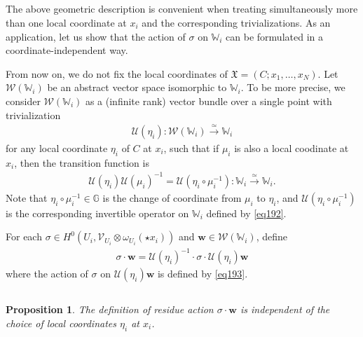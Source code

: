 \documentclass[11pt,b5paper,notitlepage]{article}
\theoremstyle{definition}
\theoremstyle{plain}
\newtheorem{pp}[df]{Proposition}
\newcommand{\fk}{\mathfrak}
\newcommand{\mc}{\mathcal}
\newcommand{\scr}{\mathscr}
\newcommand{\blt}{\bullet}
\newcommand{\Wbb}{\mathbb W}
\newcommand{\Gbb}{\mathbb G}
\newcommand{\wbf}{\mathbf w}
\numberwithin{equation}{section}
\begin{document}
\subsection{}


The above geometric description is convenient when treating simultaneously more than one local coordinate at $x_i$ and the corresponding trivializations. As an application, let us show that the action of $\sigma$ on $\Wbb_i$ can be formulated in a coordinate-independent way.



From now on, we do not fix the local coordinates of $\fk X=(C;x_1,\dots,x_N)$. Let $\scr W(\Wbb_i)$ be an abstract vector space isomorphic to $\Wbb_i$. To be more precise, we consider $\scr W(\Wbb_i)$ \index{W@$\scr W(\Wbb_i)$, $\scr W_{\fk X}(\Wbb_\blt)$} as a (infinite rank) vector bundle over a single point with trivialization \index{U@$\mc U(\alpha),\mc U(\eta),\mc U(\eta_\blt)$}
\begin{align}
\mc U(\eta_i):\scr W(\Wbb_i)\xrightarrow{\simeq} \Wbb_i
\end{align}
for any local coordinate $\eta_i$ of $C$ at $x_i$, such that if $\mu_i$ is also a local coodinate at $x_i$, then the transition function  is
\begin{align}
\mc U(\eta_i)\mc U(\mu_i)^{-1}=\mc U(\eta_i\circ\mu_i^{-1}):\Wbb_i\xrightarrow{\simeq}\Wbb_i.
\end{align}
Note that $\eta_i\circ\mu_i^{-1}\in\Gbb$ is the change of coordinate from $\mu_i$ to $\eta_i$, and $\mc U(\eta_i\circ\mu_i^{-1})$ is the corresponding invertible operator on $\Wbb_i$ defined by \eqref{eq192}.

For each $\sigma\in H^0(U_i,\scr V_{U_i}\otimes\omega_{U_i}(\star x_i))$ and $\wbf\in\scr W(\Wbb_i)$, define
\begin{align}
\sigma\cdot \wbf=\mc U(\eta_i)^{-1}\cdot \sigma\cdot \mc U(\eta_i)\wbf\label{eq194}
\end{align}
where the action of $\sigma$ on $\mc U(\eta_i)\wbf$ is defined by \eqref{eq193}.


\subsection{}

\begin{pp}\label{lb123}
The definition of residue action $\sigma\cdot \wbf$ is independent of the choice of local coordinates $\eta_i$ at $x_i$.
\end{pp}
\end{document}
